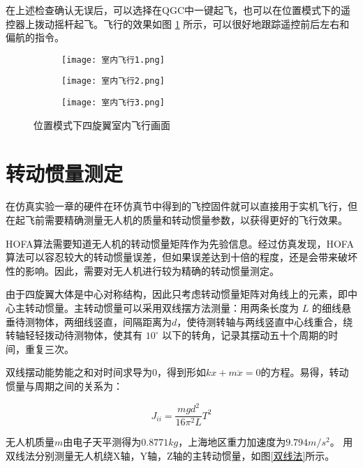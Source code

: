\newpage

在上述检查确认无误后，可以选择在QGC中一键起飞，也可以在位置模式下的遥控器上拨动摇杆起飞。飞行的效果如图 \ref{室内飞行} 所示，可以很好地跟踪遥控前后左右和偏航的指令。

\begin{figure}[h]
  \centering
  \begin{subfigure}[c]{0.33\textwidth}
    \centering
    \texttt{[image: 室内飞行1.png]}
  \end{subfigure} \hfill
  \begin{subfigure}[c]{0.33\textwidth}
    \centering
    \texttt{[image: 室内飞行2.png]}
  \end{subfigure}\hfill
    \begin{subfigure}[c]{0.33\textwidth}
      \centering
      \texttt{[image: 室内飞行3.png]}
  \end{subfigure}
  \caption{位置模式下四旋翼室内飞行画面}
  \label{室内飞行}
  \end{figure}

  \section{转动惯量测定}

  在仿真实验一章的硬件在环仿真节中得到的飞控固件就可以直接用于实机飞行，但在起飞前需要精确测量无人机的质量和转动惯量参数，以获得更好的飞行效果。

  HOFA算法需要知道无人机的转动惯量矩阵作为先验信息。经过仿真发现，HOFA算法可以容忍较大的转动惯量误差，但如果误差达到十倍的程度，还是会带来破坏性的影响。因此，需要对无人机进行较为精确的转动惯量测定。

  由于四旋翼大体是中心对称结构，因此只考虑转动惯量矩阵对角线上的元素，即中心主转动惯量。主转动惯量可以采用双线摆方法测量\cite{转动惯量}：用两条长度为 $L$ 的细线悬垂待测物体，两细线竖直，间隔距离为$d$，使待测转轴与两线竖直中心线重合，绕转轴轻轻拨动待测物体，使其有 $10 ^\circ$ 以下的转角，记录其摆动五十个周期的时间，重复三次。

  双线摆动能势能之和对时间求导为$0$，得到形如$kx+m\ddot x=0$的方程。易得，转动惯量与周期之间的关系为：

  $$
  J_{ii}=\frac{mgd^2}{16 \pi^2 L} T^2
  $$

  无人机质量$m$由电子天平测得为$0.8771kg$，上海地区重力加速度为$9.794 m/s^2$。
\newpage
  用双线法分别测量无人机绕X轴，Y轴，Z轴的主转动惯量，如图\ref{双线法}所示。

